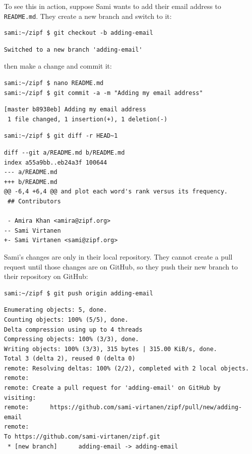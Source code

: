 \documentclass[
]{krantz}
\begin{document}
To see this in action,
suppose Sami wants to add their email address to \texttt{README.md}.
They create a new branch and switch to it:

\begin{verbatim}
sami:~/zipf $ git checkout -b adding-email
\end{verbatim}

\begin{verbatim}
Switched to a new branch 'adding-email'
\end{verbatim}

then make a change and commit it:

\begin{verbatim}
sami:~/zipf $ nano README.md
sami:~/zipf $ git commit -a -m "Adding my email address"
\end{verbatim}

\begin{verbatim}
[master b8938eb] Adding my email address
 1 file changed, 1 insertion(+), 1 deletion(-)
\end{verbatim}

\begin{verbatim}
sami:~/zipf $ git diff -r HEAD~1
\end{verbatim}

\begin{verbatim}
diff --git a/README.md b/README.md
index a55a9bb..eb24a3f 100644
--- a/README.md
+++ b/README.md
@@ -6,4 +6,4 @@ and plot each word's rank versus its frequency.
 ## Contributors
 
 - Amira Khan <amira@zipf.org>
-- Sami Virtanen
+- Sami Virtanen <sami@zipf.org>
\end{verbatim}

Sami's changes are only in their local repository.
They cannot create a pull request until those changes are on GitHub,
so they push their new branch to their repository on GitHub:

\begin{verbatim}
sami:~/zipf $ git push origin adding-email
\end{verbatim}

\begin{verbatim}
Enumerating objects: 5, done.
Counting objects: 100% (5/5), done.
Delta compression using up to 4 threads
Compressing objects: 100% (3/3), done.
Writing objects: 100% (3/3), 315 bytes | 315.00 KiB/s, done.
Total 3 (delta 2), reused 0 (delta 0)
remote: Resolving deltas: 100% (2/2), completed with 2 local objects.
remote: 
remote: Create a pull request for 'adding-email' on GitHub by visiting:
remote:      https://github.com/sami-virtanen/zipf/pull/new/adding-email
remote: 
To https://github.com/sami-virtanen/zipf.git
 * [new branch]      adding-email -> adding-email
\end{verbatim}
\end{document}
